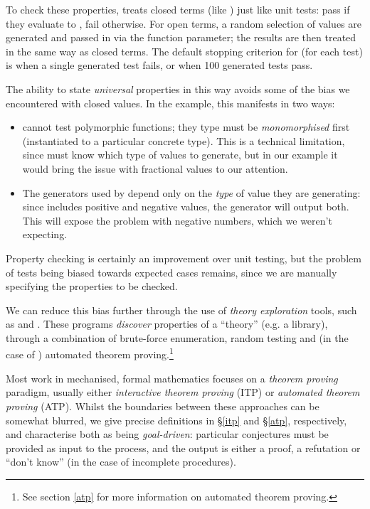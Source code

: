 To check these properties, \qcheck{} treats closed terms (like ) just like unit tests: pass if they evaluate to , fail otherwise. For open terms, a random selection of values are generated and passed in via the function parameter; the results are then treated in the same way as closed terms. The default stopping criterion for \qcheck{} (for each test) is when a single generated test fails, or when 100 generated tests pass.

The ability to state \emph{universal} properties in this way avoids some of the bias we encountered with closed values. In the  example, this manifests in two ways:

\begin{itemize}
  \item \qcheck{} cannot test polymorphic functions; they type must be \emph{monomorphised} first (instantiated to a particular concrete type). This is a technical limitation, since \qcheck{} must know which type of values to generate, but in our example it would bring the issue with fractional values to our attention.

  \item The generators used by \qcheck{} depend only on the \emph{type} of value they are generating: since  includes positive and negative values, the  generator will output both. This will expose the problem with negative numbers, which we weren't expecting.
\end{itemize}

Property checking is certainly an improvement over unit testing, but the problem of tests being biased towards expected cases remains, since we are manually specifying the properties to be checked.

We can reduce this bias further through the use of \emph{theory exploration} tools, such as \qspec{} and \hspec{}. These programs \emph{discover} properties of a ``theory'' (e.g. a library), through a combination of brute-force enumeration, random testing and (in the case of \hspec{}) automated theorem proving.\footnote{See section \ref{atp} for more information on automated theorem proving.}

\iffalse

Most work in mechanised, formal mathematics focuses on a \emph{theorem proving} paradigm, usually either \emph{interactive theorem proving} (ITP) or \emph{automated theorem proving} (ATP). Whilst the boundaries between these approaches can be somewhat blurred, we give precise definitions in \S \ref{itp} and \S \ref{atp}, respectively, and characterise both as being \emph{goal-driven}: particular conjectures must be provided as input to the process, and the output is either a proof, a refutation or ``don't know'' (in the case of incomplete procedures).

